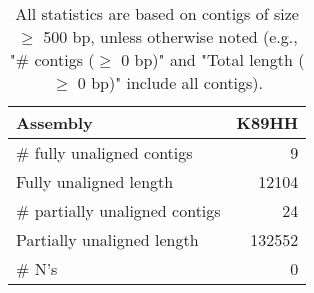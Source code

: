 \documentclass[12pt,a4paper]{article}
\begin{document}
\begin{table}[ht]
\begin{center}
\caption{All statistics are based on contigs of size $\geq$ 500 bp, unless otherwise noted (e.g., "\# contigs ($\geq$ 0 bp)" and "Total length ($\geq$ 0 bp)" include all contigs).}
\begin{tabular}{|l*{1}{|r}|}
\hline
Assembly & K89HH \\ \hline
\# fully unaligned contigs & 9 \\ \hline
Fully unaligned length & 12104 \\ \hline
\# partially unaligned contigs & 24 \\ \hline
Partially unaligned length & 132552 \\ \hline
\# N's & 0 \\ \hline
\end{tabular}
\end{center}
\end{table}
\end{document}
